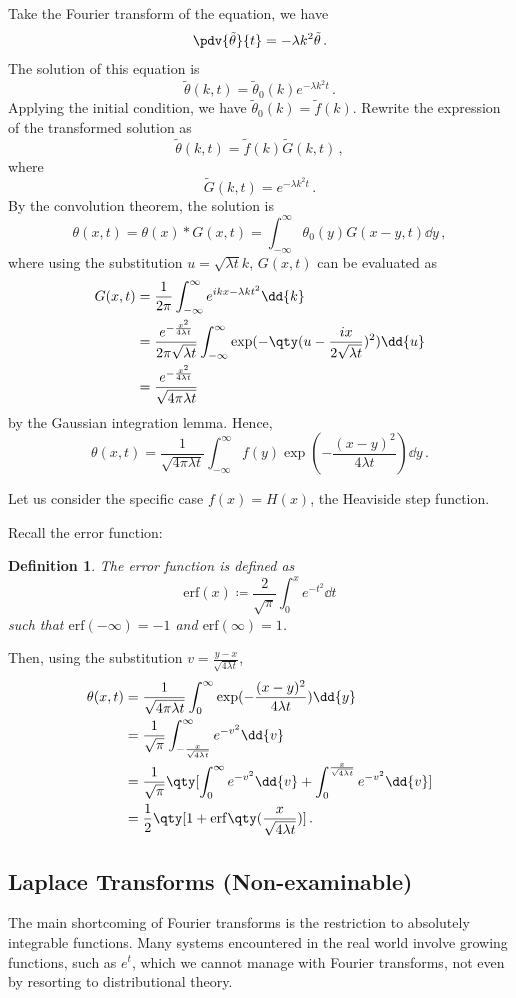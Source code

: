 \documentclass{article}
\theoremstyle{plain}\theoremheaderfont{\normalfont\itshape}\theorembodyfont{\rmfamily}\theoremseparator{.}\newtheorem*{rem}{Remark}\newtheorem*{ex}{Example}\newtheorem*{proof}{Proof}\newtheorem*{altp}{Alternative proof}
\theoremstyle{plain}\theoremheaderfont{\normalfont\bfseries}\theorembodyfont{\rmfamily}\theoremseparator{.}\newtheorem{thm}{Theorem}[section]\newtheorem{lem}[thm]{Lemma}\newtheorem{prop}[thm]{Proposition}\newtheorem*{cor}{Corollary}\newtheorem{defn}[thm]{Definition}\newtheorem{clm}[thm]{Claim}\newtheorem{clminproof}{Claim}
\theoremstyle{break}\theoremheaderfont{\normalfont\itshape}\theorembodyfont{\rmfamily}\theoremseparator{.\medskip}\newtheorem*{proofskip}{Proof}\newtheorem*{exs}{Examples}\newtheorem*{rems}{Remarks}
\theoremstyle{break}\theoremheaderfont{\normalfont\bfseries}\theorembodyfont{\rmfamily}\theoremseparator{.\medskip}\newtheorem{lemskip}[thm]{Lemma}\newtheorem{defnskip}[thm]{Definition}\newtheorem{propskip}[thm]{Proposition}\newtheorem{thmskip}[thm]{Theorem}
\numberwithin{equation}{section}
\begin{document}
	Take the Fourier transform of the equation, we have
	\[\pdv{\tilde{\theta}}{t}=-\lambda k^2\tilde{\theta}\,.\]
	The solution of this equation is
	\[\tilde{\theta}(k,t)=\tilde{\theta}_0(k)e^{-\lambda k^2 t}\,.\]
	Applying the initial condition, we have
	\(\tilde{\theta}_0(k)=\tilde{f}(k)\). Rewrite the expression of the transformed solution as
	\[\tilde{\theta}(k,t)=\tilde{f}(k)\tilde{G}(k,t)\,,\]
	where
	\[\tilde{G}(k,t)=e^{-\lambda k^2t}\,.\]
	By the convolution theorem, the solution is
	\[\theta(x,t)=\theta(x)*G(x,t)=\int_{-\infty}^{\infty}\theta_0(y)G(x-y,t)\dd{y}\,,\]
	where using the substitution \(u=\sqrt{\lambda t}k\), \(G(x,t)\) can be evaluated as
	\begin{align*}
		G(x,t)&=\frac{1}{2\pi}\int_{-\infty}^{\infty}e^{ikx-\lambda kt^2}\dd{k}\\
		&=\frac{e^{-\frac{x^2}{4\lambda t}}}{2\pi\sqrt{\lambda t}}\int_{-\infty}^{\infty}\exp(-\qty(u-\frac{ix}{2\sqrt{\lambda t}})^2)\dd{u}\\
		&=\frac{e^{-\frac{x^2}{4\lambda t}}}{\sqrt{4\pi\lambda t}}
	\end{align*}
	by the Gaussian integration lemma. Hence,
	\[\theta(x,t)=\frac{1}{\sqrt{4\pi\lambda t}}\int_{-\infty}^{\infty}f(y)\exp(-\frac{(x-y)^2}{4\lambda t})\dd{y}\,.\]

	Let us consider the specific case \(f(x)=H(x)\), the Heaviside step function.

	Recall the error function:
	\begin{defn}
		The \textit{error function} is defined as
		\[\mathrm{erf}(x)\coloneqq\frac{2}{\sqrt{\pi}}\int_{0}^{x}e^{-t^2}\dd{t}\]
		such that \(\mathrm{erf}(-\infty)=-1\) and \(\mathrm{erf}(\infty)=1\).
	\end{defn}

	Then, using the substitution \(v=\frac{y-x}{\sqrt{4\lambda t}}\),
	\begin{align*}
		\theta(x,t)&=\frac{1}{\sqrt{4\pi\lambda t}}\int_{0}^{\infty}\exp(-\frac{(x-y)^2}{4\lambda t})\dd{y}\\
		&=\frac{1}{\sqrt{\pi}}\int_{-\frac{x}{\sqrt{4\lambda t}}}^{\infty}e^{-v^2}\dd{v}\\
		&=\frac{1}{\sqrt{\pi}}\qty[\int_{0}^{\infty}e^{-v^2}\dd{v}+\int_{0}^{\frac{x}{\sqrt{4\lambda t}}}e^{-v^2}\dd{v}]\\
		&=\frac{1}{2}\qty[1+\mathrm{erf}\qty(\frac{x}{\sqrt{4\lambda t}})]\,.
	\end{align*}
	\subsection{Laplace Transforms (Non-examinable)}
	The main shortcoming of Fourier transforms is the restriction to absolutely integrable functions. Many systems encountered in the real world involve growing functions, such as \(e^t\), which we cannot manage with Fourier transforms, not even by resorting to distributional theory.
	
\end{document}
